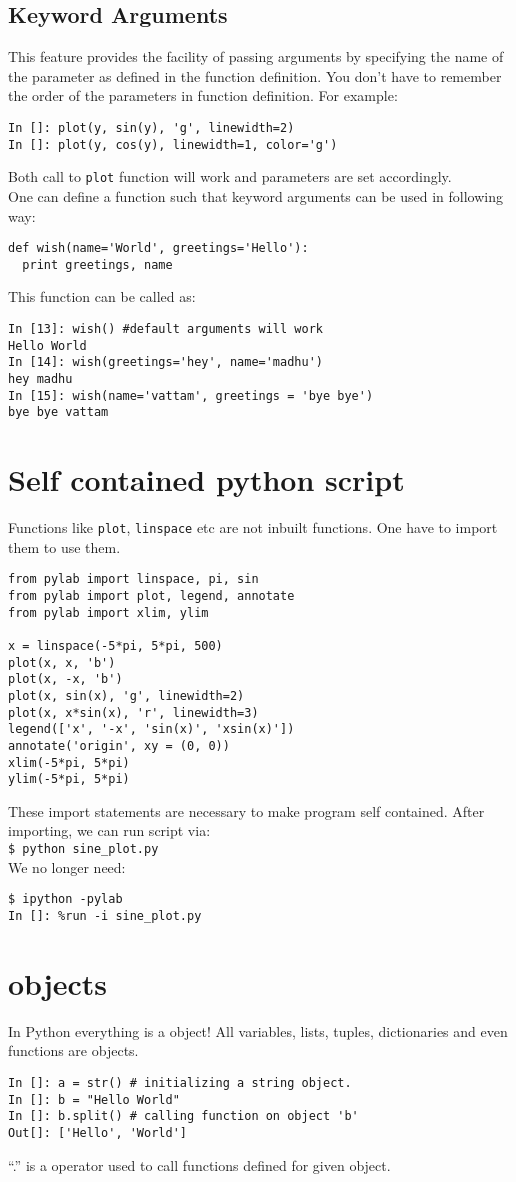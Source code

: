 \documentclass[12pt]{article}
\newcommand{\typ}[1]{\lstinline{#1}}
\begin{document}
\subsection{Keyword Arguments}
This feature provides the facility of passing arguments by specifying the name of the parameter as defined in the function definition. You don't have to remember the order of the parameters in function definition. For example:
\begin{lstlisting}
In []: plot(y, sin(y), 'g', linewidth=2)
In []: plot(y, cos(y), linewidth=1, color='g')
\end{lstlisting}
Both call to \typ{plot} function will work and parameters are set accordingly.\\
One can define a function such that keyword arguments can be used in following way:
\begin{lstlisting}
def wish(name='World', greetings='Hello'):
  print greetings, name
\end{lstlisting}
This function can be called as:
\begin{lstlisting}
In [13]: wish() #default arguments will work
Hello World
In [14]: wish(greetings='hey', name='madhu')
hey madhu
In [15]: wish(name='vattam', greetings = 'bye bye')
bye bye vattam
\end{lstlisting}
\section{Self contained python script}
Functions like \typ{plot}, \typ{linspace} etc are not inbuilt functions. One have to import them to use them.
  \begin{lstlisting}
from pylab import linspace, pi, sin
from pylab import plot, legend, annotate
from pylab import xlim, ylim

x = linspace(-5*pi, 5*pi, 500)
plot(x, x, 'b')
plot(x, -x, 'b')
plot(x, sin(x), 'g', linewidth=2)
plot(x, x*sin(x), 'r', linewidth=3)
legend(['x', '-x', 'sin(x)', 'xsin(x)'])
annotate('origin', xy = (0, 0))
xlim(-5*pi, 5*pi)
ylim(-5*pi, 5*pi)
  \end{lstlisting}
These import statements are necessary to make program self contained. After importing, we can run script via:\\
\typ{$ python sine_plot.py} \\ %
We no longer need:
\begin{lstlisting}
$ ipython -pylab
In []: %run -i sine_plot.py
\end{lstlisting} %
\section{objects}
In Python everything is a object! All variables, lists, tuples, dictionaries and even functions are objects. 
\begin{lstlisting}
In []: a = str() # initializing a string object.
In []: b = "Hello World"
In []: b.split() # calling function on object 'b'
Out[]: ['Hello', 'World']
\end{lstlisting}
``.'' is a operator used to call functions defined for given object.
\end{document}
